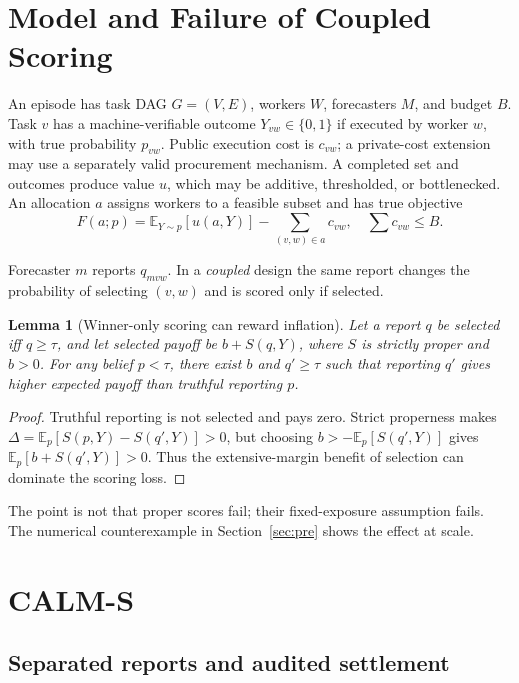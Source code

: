 \documentclass[sigconf,anonymous,review]{acmart}
\newtheorem{lemma}{Lemma}
\begin{document}
\section{Model and Failure of Coupled Scoring}

An episode has task DAG $G=(V,E)$, workers $W$, forecasters $M$, and budget $B$.
Task $v$ has a machine-verifiable outcome $Y_{vw}\in\{0,1\}$ if executed by
worker $w$, with true probability $p_{vw}$. Public execution cost is $c_{vw}$;
a private-cost extension may use a separately valid procurement mechanism. A
completed set and outcomes produce value $u$, which may be additive, thresholded,
or bottlenecked. An allocation $a$ assigns workers to a feasible subset and has
true objective
\begin{equation}
F(a;p)=\mathbb{E}_{Y\sim p}[u(a,Y)]-\sum_{(v,w)\in a}c_{vw},
\quad \sum c_{vw}\le B.
\end{equation}

Forecaster $m$ reports $q_{mvw}$. In a \emph{coupled} design the same report
changes the probability of selecting $(v,w)$ and is scored only if selected.

\begin{lemma}[Winner-only scoring can reward inflation]\label{lem:coupled}
Let a report $q$ be selected iff $q\ge\tau$, and let selected payoff be
$b+S(q,Y)$, where $S$ is strictly proper and $b>0$. For any belief $p<\tau$,
there exist $b$ and $q'\ge\tau$ such that reporting $q'$ gives higher expected
payoff than truthful reporting $p$.
\end{lemma}
\begin{proof}
Truthful reporting is not selected and pays zero. Strict properness makes
$\Delta=\mathbb{E}_p[S(p,Y)-S(q',Y)]>0$, but choosing
$b>-\mathbb{E}_p[S(q',Y)]$ gives $\mathbb{E}_p[b+S(q',Y)]>0$. Thus the extensive-margin benefit
of selection can dominate the scoring loss.
\end{proof}

The point is not that proper scores fail; their fixed-exposure assumption fails.
The numerical counterexample in Section~\ref{sec:pre} shows the effect at scale.

\section{CALM-S}

\subsection{Separated reports and audited settlement}
\end{document}
